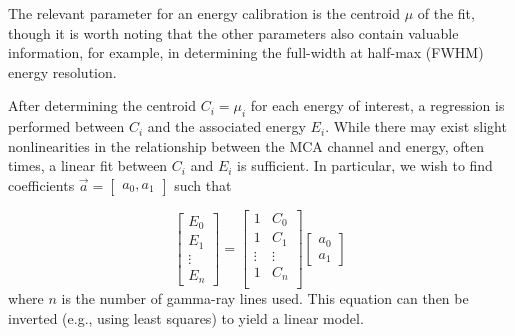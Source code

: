 The relevant parameter for an energy calibration is the centroid $\mu$ of the fit, though it is worth noting that the other parameters also contain valuable information, for example, in determining the full-width at half-max (FWHM) energy resolution.

After determining the centroid $C_i = \mu_i$ for each energy of interest, a regression is performed between $C_i$ and the associated energy $E_i$. While there may exist slight nonlinearities in the relationship between the MCA channel and energy, often times, a linear fit between $C_i$ and $E_i$ is sufficient.
In particular, we wish to find coefficients
$\vec{a} = \begin{bmatrix}a_0, a_1 \end{bmatrix}$ such that

\begin{equation}
    \begin{bmatrix}
        E_0 \\ E_1 \\ \vdots \\ E_n
    \end{bmatrix} =
    \begin{bmatrix}
        1 & C_0 \\
        1 & C_1 \\
        \vdots & \vdots \\
        1 & C_n \\
    \end{bmatrix}
    \begin{bmatrix}
        a_0 \\ a_1
    \end{bmatrix}
\end{equation}
where $n$ is the number of gamma-ray lines used. This equation can then be inverted (e.g., using least squares) to yield a linear model.
